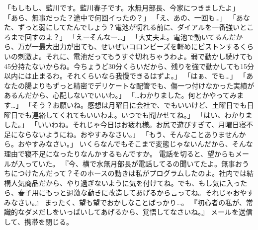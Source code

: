 「もしもし、藍川です。藍川春子です。水無月部長、今家につきましたよ」
「あら、無事だった？途中で何回イったの？」
「え、あの、一回も…」
「あなた、ずっと弱にしてたんでしょう？電池が切れる前に、ダイアルを一番強いところまで回すのよ？」
「えーそんなー…」
「大丈夫よ。電池で動いてるんだから、万が一最大出力が出ても、せいぜいコロンビーズを軽めにピストンするくらいの刺激よ。それに、電池だってもうすぐ切れちゃうわよ。弱で動かし続けても45分持たないからね。今ちょうど30分くらいだから、残りを強で動かしても15分以内には止まるわ。それくらいなら我慢できるはずよ。」
「はぁ、でも…」
「あなたの腸よりもずっと精密でデリケートな配管でも、傷一つ付けなかった実績があるんだから、心配しないでいいわ。」
「…わかりました。何とかやってみます…」
「そう？お願いね。感想は月曜日に会社で、でもいいけど、土曜日でも日曜日でも連絡してくれてもいいわよ。いつでも聞かせてね。」
「はい、わかりました。」
「いいわね。それじゃ今日はお疲れ様。お尻で遊びすぎて、月曜日寝不足にならないようにね。おやすみなさい。」
「もう、そんなことありませんから。おやすみなさい。」
いくらなんでもそこまで変態じゃないんだから、そんな理由で寝不足になったりなんかするもんですか。
電話を切ると、望からもメールが入っていた。
『今、横で水無月部長が電話してるの聞いてたよ。無事おうちにつけたんだって？そのホースの動きは私がプログラムしたのよ。社内では結構人気商品だから、やり過ぎないように気を付けてね。でも、もし気に入ったら、春子用にもっと過激な動きに改造してあげるから言ってね。それじゃおやすみなさい。』
まったく、望も望でおかしなことばっかり…。
『初心者の私が、常識的なダメだしをいっぱいしてあげるから、覚悟してなさいね。』
メールを送信して、携帯を閉じる。

